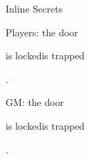 \begin{ExampleBlock}{Inline Secrets}

Players: the door \begin{RpgSecret}{is locked}is trapped\end{RpgSecret}.

GM: the door \begin{RpgSecret}{is locked}is trapped\end{RpgSecret}.

\end{ExampleBlock}
